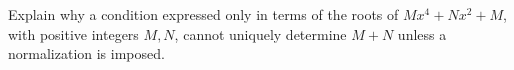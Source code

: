Explain why a condition expressed only in terms of the roots of $Mx^4+Nx^2+M$, with positive integers $M,N$, cannot uniquely determine $M+N$ unless a normalization is imposed.
